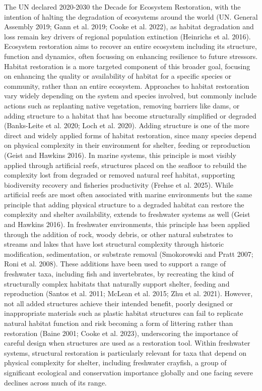 \documentclass[
  12pt,
  a4paper,
  oneside]{scrbook}
\begin{document}
The UN declared 2020-2030 the Decade for Ecosystem Restoration, with the
intention of halting the degradation of ecosystems around the world (UN.
General Assembly 2019; Gann et al. 2019; Cooke et al. 2022), as habitat
degradation and loss remain key drivers of regional population
extinction (Heinrichs et al. 2016). Ecosystem restoration aims to
recover an entire ecosystem including its structure, function and
dynamics, often focussing on enhancing resilience to future stressors.
Habitat restoration is a more targeted component of this broader goal,
focusing on enhancing the quality or availability of habitat for a
specific species or community, rather than an entire ecosystem.
Approaches to habitat restoration vary widely depending on the system
and species involved, but commonly include actions such as replanting
native vegetation, removing barriers like dams, or adding structure to a
habitat that has become structurally simplified or degraded (Banks-Leite
et al. 2020; Loch et al. 2020). Adding structure is one of the more
direct and widely applied forms of habitat restoration, since many
species depend on physical complexity in their environment for shelter,
feeding or reproduction (Geist and Hawkins 2016). In marine systems,
this principle is most visibly applied through artificial reefs,
structures placed on the seafloor to rebuild the complexity lost from
degraded or removed natural reef habitat, supporting biodiversity
recovery and fisheries productivity (Frehse et al. 2025). While
artificial reefs are most often associated with marine environments but
the same principle that adding physical structure to a degraded habitat
can restore the complexity and shelter availability, extends to
freshwater systems as well (Geist and Hawkins 2016). In freshwater
environments, this principle has been applied through the addition of
rock, woody debris, or other natural substrates to streams and lakes
that have lost structural complexity through historic modification,
sedimentation, or substrate removal (Smokorowski and Pratt 2007; Roni et
al. 2008). These additions have been used to support a range of
freshwater taxa, including fish and invertebrates, by recreating the
kind of structurally complex habitats that naturally support shelter,
feeding and reproduction (Santos et al. 2011; McLean et al. 2015; Zhu et
al. 2021). However, not all added structures achieve their intended
benefit, poorly designed or inappropriate materials such as plastic
habitat structures can fail to replicate natural habitat function and
risk becoming a form of littering rather than restoration (Baine 2001;
Cooke et al. 2023), underscoring the importance of careful design when
structures are used as a restoration tool. Within freshwater systems,
structural restoration is particularly relevant for taxa that depend on
physical complexity for shelter, including freshwater crayfish, a group
of significant ecological and conservation importance globally and one
facing severe declines across much of its range.
\end{document}
